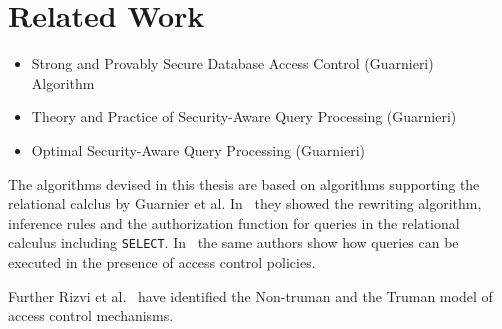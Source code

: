 \section{Related Work}

\begin{itemize}
	\item Strong and Provably Secure Database Access Control (Guarnieri) \\
	Algorithm
	\item Theory and Practice of Security-Aware Query Processing (Guarnieri) 
	\item Optimal Security-Aware Query Processing (Guarnieri)
\end{itemize}

The algorithms devised in this thesis are based on algorithms supporting the relational calclus by Guarnier et al. In~\cite{guarnieri2016strong} they showed the rewriting algorithm, inference rules and the authorization function for queries in the relational calculus including \texttt{SELECT}.
%
In~\cite{guarnieri2014optimal} the same authors show how queries can be executed in the presence of access control policies.

Further Rizvi et al.~\cite{rizvi2004extending} have identified the Non-truman and the Truman model of access control mechanisms.

